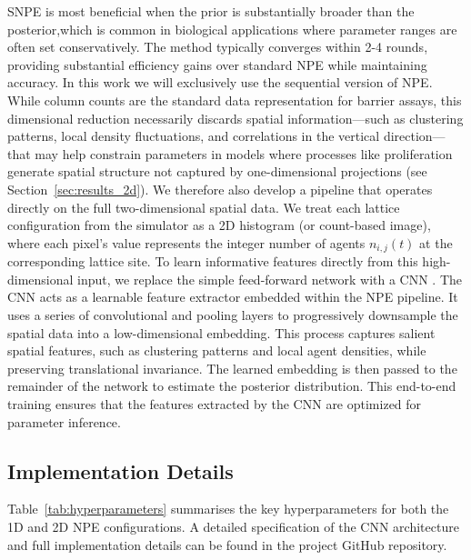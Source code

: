 \documentclass{article}
\providecommand{\DIFaddtex}[1]{{\protect\color{blue} \sf #1}} %
\providecommand{\DIFdeltex}[1]{{\protect\color{red} \scriptsize #1}} %
\providecommand{\DIFaddbegin}{} %
\providecommand{\DIFaddend}{} %
\providecommand{\DIFdelbegin}{} %
\providecommand{\DIFdelend}{} %
\providecommand{\DIFadd}[1]{\texorpdfstring{\DIFaddtex{#1}}{#1}} %
\providecommand{\DIFdel}[1]{\texorpdfstring{\DIFdeltex{#1}}{}} %
\newcommand{\DIFscaledelfig}{0.5}
\newlength{\DIFdelgraphicswidth} %
\newlength{\DIFdelgraphicsheight} %
\newcommand{\DIFaddincludegraphics}[2][]{{\color{blue}\fbox{\DIFOincludegraphics[#1]{#2}}}} %
\newcommand{\DIFdelincludegraphics}[2][]{%
\sbox{\DIFdelgraphicsbox}{\DIFOincludegraphics[#1]{#2}}%
\settoboxwidth{\DIFdelgraphicswidth}{\DIFdelgraphicsbox} %
\settoboxtotalheight{\DIFdelgraphicsheight}{\DIFdelgraphicsbox} %
\scalebox{\DIFscaledelfig}{%
\parbox[b]{\DIFdelgraphicswidth}{\usebox{\DIFdelgraphicsbox}\\[-\baselineskip] \rule{\DIFdelgraphicswidth}{0em}}\llap{\resizebox{\DIFdelgraphicswidth}{\DIFdelgraphicsheight}{%
\setlength{\unitlength}{\DIFdelgraphicswidth}%
\begin{picture}(1,1)%
\thicklines\linethickness{2pt} %
{\color[rgb]{1,0,0}\put(0,0){\framebox(1,1){}}}%
{\color[rgb]{1,0,0}\put(0,0){\line( 1,1){1}}}%
{\color[rgb]{1,0,0}\put(0,1){\line(1,-1){1}}}%
\end{picture}%
}\hspace*{3pt}}} %
} %
\DeclareRobustCommand{\DIFaddbegin}{\DIFOaddbegin \let\includegraphics\DIFaddincludegraphics} %
\DeclareRobustCommand{\DIFaddend}{\DIFOaddend \let\includegraphics\DIFOincludegraphics} %
\DeclareRobustCommand{\DIFdelbegin}{\DIFOdelbegin \let\includegraphics\DIFdelincludegraphics} %
\DeclareRobustCommand{\DIFdelend}{\DIFOaddend \let\includegraphics\DIFOincludegraphics} %
\begin{document}
\DIFdelbegin \DIFdel{SNPE is most beneficial when the prior is substantially broader than the posterior,which is common in biological applications where parameter ranges are often set conservatively. The method typically converges within 2-4 rounds, providing substantial efficiency gains over standard NPE while maintaining accuracy. In this work we will exclusively use the sequential version of NPE. }\DIFdelend \DIFaddbegin \DIFadd{While column counts are the standard data representation for barrier assays, this dimensional reduction necessarily discards spatial information---such as clustering patterns, local density fluctuations, and correlations in the vertical direction---that may help constrain parameters in models where processes like proliferation generate spatial structure not captured by one-dimensional projections (see Section~\ref{sec:results_2d}). We therefore also develop a pipeline that operates directly on the full two-dimensional spatial data. We treat each lattice configuration from the simulator as a 2D histogram (or count-based image), where each pixel's value represents the integer number of agents $n_{i,j}(t)$ at the corresponding lattice site. To learn informative features directly from this high-dimensional input, we replace the simple feed-forward network with a CNN \citep{lecun1998,krizhevsky2012,goodfellow2016}. The CNN acts as a learnable feature extractor embedded within the NPE pipeline. It uses a series of convolutional and pooling layers to progressively downsample the spatial data into a low-dimensional embedding. This process captures salient spatial features, such as clustering patterns and local agent densities, while preserving translational invariance. The learned embedding is then passed to the remainder of the network to estimate the posterior distribution. This end-to-end training ensures that the features extracted by the CNN are optimized for parameter inference.
}\DIFaddend 

\DIFdelbegin \subsection{\DIFdel{Implementation Details}}
\addtocounter{subsection}{-1}%
\DIFdelend \DIFaddbegin \DIFadd{Table~\ref{tab:hyperparameters} summarises the key hyperparameters for both the 1D and 2D NPE configurations. A detailed specification of the CNN architecture and full implementation details can be found in the project GitHub repository.
}\DIFaddend 
\end{document}
